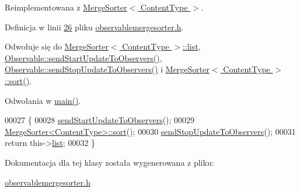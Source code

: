 Reimplementowana z \hyperlink{class_merge_sorter_a4c0c1cf429c3d20dacea113c9669528a}{Merge\-Sorter$<$ Content\-Type $>$}.



Definicja w linii \hyperlink{observablemergesorter_8h_source_l00026}{26} pliku \hyperlink{observablemergesorter_8h_source}{observablemergesorter.\-h}.



Odwołuje się do \hyperlink{mergesorter_8h_source_l00021}{Merge\-Sorter$<$ Content\-Type $>$\-::list}, \hyperlink{observable_8h_source_l00029}{Observable\-::send\-Start\-Update\-To\-Observers()}, \hyperlink{observable_8h_source_l00039}{Observable\-::send\-Stop\-Update\-To\-Observers()} i \hyperlink{mergesorter_8h_source_l00096}{Merge\-Sorter$<$ Content\-Type $>$\-::sort()}.



Odwołania w \hyperlink{main_8cpp_source_l00022}{main()}.


\begin{DoxyCode}
00027         \{
00028                 \hyperlink{class_observable_a78df64057f152342a43f27979186a6ba}{sendStartUpdateToObservers}();
00029                 \hyperlink{class_merge_sorter_a4c0c1cf429c3d20dacea113c9669528a}{MergeSorter<ContentType>::sort}();
00030                 \hyperlink{class_observable_a16f75ed1514a0cb7526b5a5d2b7ca7c6}{sendStopUpdateToObservers}();
00031                 \textcolor{keywordflow}{return} this->\hyperlink{class_merge_sorter_a2fdeadd95d226a04243bab8b5104e324}{list};
00032         \}
\end{DoxyCode}


Dokumentacja dla tej klasy została wygenerowana z pliku\-:\begin{DoxyCompactItemize}
\item 
\hyperlink{observablemergesorter_8h}{observablemergesorter.\-h}\end{DoxyCompactItemize}
